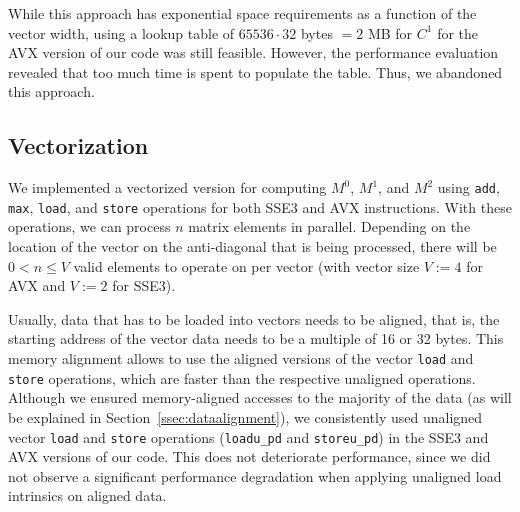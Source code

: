 \documentclass[runningheads,a4paper]{llncs}
\begin{document}
While this approach has exponential space requirements as a function of the vector width, using a lookup table of $65536 \cdot 32$ bytes $= 2$ MB for $C^1$ for 
the AVX version of our code was still feasible. 
However, the performance evaluation revealed that too much time is spent to populate the table. 
Thus, we abandoned this approach.



\subsection{Vectorization}
\label{ssec:vectorization}

We implemented a vectorized version for computing 
$M^0$, $M^1$, and $M^2$ using \texttt{add}, \texttt{max}, \texttt{load}, and \texttt{store}
operations for both SSE3 and AVX instructions.  
With these operations, we can process $n$ matrix elements in parallel.  
Depending on the location of the vector on the anti-diagonal that is being processed, there will be $0 < n \leq V$ valid elements to operate on 
per vector (with vector size $V := 4$ for AVX and $V := 2$ for SSE3). 

Usually, data that has to be loaded into vectors needs to be aligned, that is, the starting %
address of the vector data needs to be a multiple of 16 or 32 bytes. This memory alignment allows to
use the aligned versions of the vector \texttt{load} and \texttt{store} operations,
which are faster than the respective unaligned operations.
Although we ensured memory-aligned accesses to the majority of the data (as will be explained in
Section~\ref{ssec:dataalignment}), we consistently used unaligned vector \texttt{load} and \texttt{store}
operations (\texttt{loadu\_pd} and \texttt{storeu\_pd}) in the SSE3 and AVX versions of our code. 
This does not deteriorate performance, since we did not observe a significant performance degradation when
applying unaligned load intrinsics on aligned data.
\end{document}
